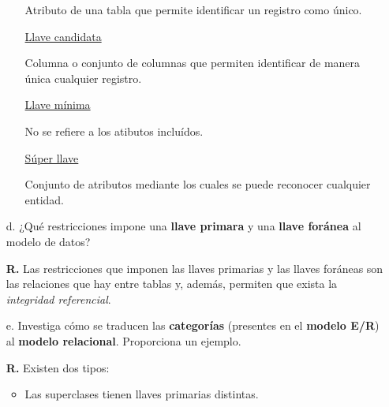 \documentclass[12pt, letterpaper]{article}
\begin{document}
\begin{itemize}
\begin{itemize}
                                  Atributo de una tabla que permite identificar 
                                  un registro como único. 

                          \item[] \underline{Llave candidata}\vspace{.1cm}
                           
                                  Columna o conjunto de columnas que permiten
                                  identificar de manera única cualquier registro. 

                          \item[] \underline{Llave mínima}\vspace{.1cm}
                           
                                  No se refiere a los atibutos incluídos. 

                          \item[] \underline{Súper llave}\vspace{.1cm}
                         
                                  Conjunto de atributos mediante los cuales se puede
                                  reconocer cualquier entidad. 

                      \end{itemize}

            \item[d.] ¿Qué restricciones impone una \textbf{llave primara} y una
                      \textbf{llave foránea} al modelo de datos? \vspace{.1cm}

                      \textbf{R.} Las restricciones que imponen las llaves primarias
                                  y las llaves foráneas son las relaciones que hay
                                  entre tablas y, además, permiten que exista la 
                                  \textit{integridad referencial}.
                                  
            \item[e.] Investiga cómo se traducen las \textbf{categorías}
                      (presentes en el \textbf{modelo E/R}) al \textbf{modelo 
                      relacional}. Proporciona un ejemplo. \vspace{.1cm}

                      \textbf{R.} Existen dos tipos:

                      \begin{itemize}
                          \item Las superclases tienen llaves primarias distintas. \vspace{.3cm}
                          

\end{itemize}
\end{itemize}
\end{document}

